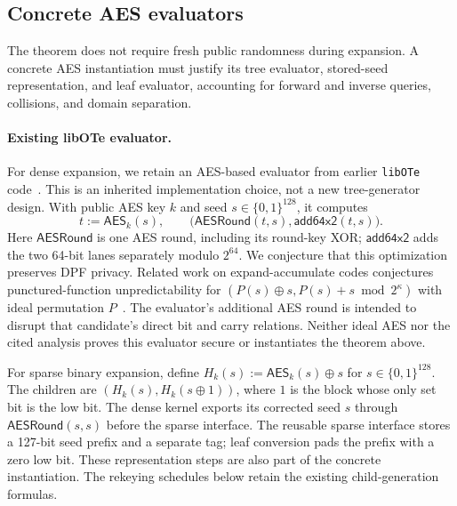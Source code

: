\subsection{Concrete AES evaluators}
\label{app:dpf-aes}

The theorem does not require fresh public randomness during expansion.
A concrete AES instantiation must justify its tree evaluator, stored-seed
representation, and leaf evaluator, accounting for forward and inverse
queries, collisions, and domain separation.

\paragraph{Existing libOTe evaluator.}
For dense expansion, we retain an AES-based evaluator from earlier
\texttt{libOTe} code~\cite{libOTe}. This is an inherited implementation
choice, not a new tree-generator design. With public AES key $k$ and seed
$s\in\{0,1\}^{128}$, it computes
\[
 t:=\mathsf{AES}_k(s),\qquad
 \bigl(\mathsf{AESRound}(t,s),\mathsf{add64x2}(t,s)\bigr).
\]
Here $\mathsf{AESRound}$ is one AES round, including its round-key XOR;
$\mathsf{add64x2}$ adds the two 64-bit lanes separately modulo $2^{64}$.
We conjecture that this optimization preserves DPF privacy. Related work on
expand-accumulate codes conjectures punctured-function unpredictability for
$(P(s)\oplus s,P(s)+s\bmod 2^\kappa)$ with ideal permutation
$P$~\cite[Section~6.2, Conjecture~6.4]{pcgExpandAccumulate}.
The evaluator's additional AES round is intended to disrupt that candidate's
direct bit and carry relations. Neither ideal AES nor the cited analysis
proves this evaluator secure or instantiates the theorem above.

For sparse binary expansion, define
$H_k(s):=\mathsf{AES}_k(s)\oplus s$ for $s\in\{0,1\}^{128}$.
The children are $(H_k(s),H_k(s\oplus1))$, where $1$ is the block whose
only set bit is the low bit. The dense kernel exports its corrected seed
$s$ through $\mathsf{AESRound}(s,s)$ before the sparse interface.
The reusable sparse interface stores a 127-bit seed prefix and a separate
tag; leaf conversion pads the prefix with a zero low bit.
These representation steps are also part of the concrete instantiation.
The rekeying schedules below retain the existing child-generation formulas.

